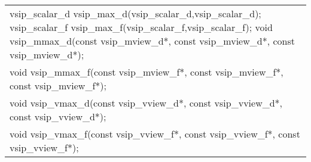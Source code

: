 \\\cvsiplh
\afh
{
\ttfamily
\\\hspace*{.04\textwidth}\begin{tabular}[H]{l}
vsip\_scalar\_d vsip\_max\_d(vsip\_scalar\_d,vsip\_scalar\_d);
vsip\_scalar\_f vsip\_max\_f(vsip\_scalar\_f,vsip\_scalar\_f);
void vsip\_mmax\_d(const vsip\_mview\_d*, const vsip\_mview\_d*, const vsip\_mview\_d*);\\
void vsip\_mmax\_f(const vsip\_mview\_f*, const vsip\_mview\_f*, const vsip\_mview\_f*);\\
void vsip\_vmax\_d(const vsip\_vview\_d*, const vsip\_vview\_d*, const vsip\_vview\_d*);\\
void vsip\_vmax\_f(const vsip\_vview\_f*, const vsip\_vview\_f*, const vsip\_vview\_f*);\\
\end{tabular}
}
\\\pyjvsiph
%
%
%
